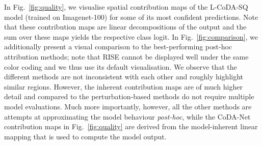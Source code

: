  In Fig.~\ref{fig:quality}, we visualise spatial contribution maps of the L-CoDA-SQ model (trained on Imagenet-100) for some of its most confident predictions. Note that these contribution maps are linear decompositions of the output and the sum over these maps yields the respective class logit. In Fig.~\ref{fig:comparison}, we additionally present a visual comparison to the best-performing post-hoc attribution methods; note that RISE cannot be displayed well under the same color coding and we thus use its default visualisation. We observe that the different methods are not inconsistent with each other and roughly highlight similar regions. However, the inherent contribution maps are of much higher detail and compared to the perturbation-based methods do not require multiple model evaluations. Much more importantly, however, all the other methods are attempts at approximating the model behaviour \emph{post-hoc}, while the CoDA-Net contribution maps in Fig.~\ref{fig:quality} are derived from the model-inherent linear mapping that is used to compute the model output.